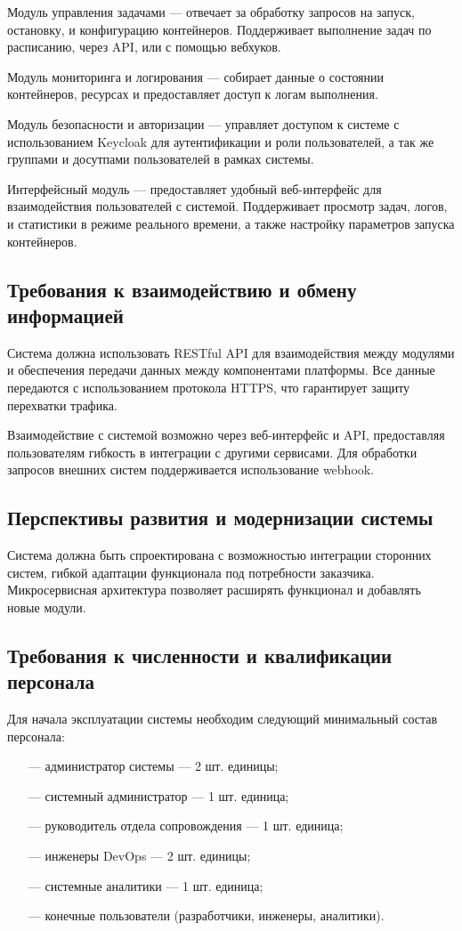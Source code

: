 Модуль управления задачами — отвечает за обработку запросов на запуск, остановку, и конфигурацию контейнеров. Поддерживает выполнение задач по расписанию, через API, или с помощью вебхуков.

Модуль мониторинга и логирования — собирает данные о состоянии контейнеров, ресурсах и предоставляет доступ к логам выполнения. 

Модуль безопасности и авторизации — управляет доступом к системе с использованием Keycloak для аутентификации и роли пользователей, а так же группами и досутпами пользователей в рамках системы.

Интерфейсный модуль — предоставляет удобный веб-интерфейс для взаимодействия пользователей с системой. Поддерживает просмотр задач, логов, и статистики в режиме реального времени, а также настройку параметров запуска контейнеров.

\subsection{Требования к взаимодействию и обмену информацией}

Система должна использовать RESTful API для взаимодействия между модулями и обеспечения передачи данных между компонентами платформы. Все данные передаются с использованием протокола HTTPS, что гарантирует защиту перехватки трафика.

Взаимодействие с системой возможно через веб-интерфейс и API, предоставляя пользователям гибкость в интеграции с другими сервисами. Для обработки запросов внешних систем поддерживается использование webhook.

\subsection{Перспективы развития и модернизации системы}

Система должна быть спроектирована с возможностью интеграции сторонних систем, гибкой адаптации функционала под потребности заказчика. Микросервисная архитектура позволяет расширять функционал и добавлять новые модули.

\subsection{Требования к численности и квалификации персонала}

Для начала эксплуатации системы необходим следующий минимальный состав персонала:

\begin{itemize}
\item[---]администратор системы — 2 шт. единицы;
\item[---]системный администратор — 1 шт. единица;
\item[---]руководитель отдела сопровождения — 1 шт. единица;
\item[---]инженеры DevOps — 2 шт. единицы;
\item[---]системные аналитики — 1 шт. единица;
\item[---]конечные пользователи (разработчики, инженеры, аналитики).
\end{itemize}

